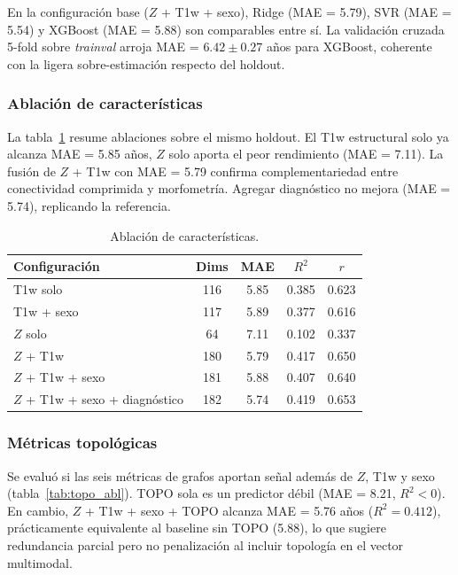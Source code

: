 \documentclass[12pt,a4paper]{article}
\begin{document}
En la configuración base ($Z$ + T1w + sexo), Ridge (MAE = 5.79), SVR (MAE = 5.54) y XGBoost
(MAE = 5.88) son comparables entre sí. La validación cruzada 5-fold sobre \emph{trainval}
arroja MAE = $6.42 \pm 0.27$ años para XGBoost, coherente con la ligera sobre-estimación respecto del holdout.

\subsubsection{Ablación de características}

La tabla~\ref{tab:ablacion} resume ablaciones sobre el mismo holdout. El T1w estructural solo ya alcanza MAE = 5.85 años, $Z$ solo aporta el peor rendimiento (MAE = 7.11). La fusión de $Z$ + T1w con MAE = 5.79 confirma complementariedad entre conectividad comprimida y morfometría. Agregar diagnóstico no mejora (MAE = 5.74), replicando la referencia\cite{bazan2026}.

\begin{table}[H]
  \centering
  \caption{Ablación de características.}
  \label{tab:ablacion}
  \begin{tabular}{lcccc}
    \toprule
    Configuración & Dims & MAE & $R^2$ & $r$ \\
    \midrule
    T1w solo & 116 & 5.85 & 0.385 & 0.623 \\
    T1w + sexo & 117 & 5.89 & 0.377 & 0.616 \\
    $Z$ solo & 64 & 7.11 & 0.102 & 0.337 \\
    $Z$ + T1w & 180 & 5.79 & 0.417 & 0.650 \\
    $Z$ + T1w + sexo & 181 & 5.88 & 0.407 & 0.640 \\
    $Z$ + T1w + sexo + diagnóstico & 182 & 5.74 & 0.419 & 0.653 \\
    \bottomrule
  \end{tabular}
\end{table}

\subsubsection{Métricas topológicas}

Se evaluó si las seis métricas de grafos\cite{rubinov2010} aportan señal además de $Z$, T1w y sexo (tabla~\ref{tab:topo_abl}). TOPO sola es un predictor débil (MAE = 8.21, $R^2 < 0$). En cambio, $Z$ + T1w + sexo + TOPO alcanza MAE = 5.76 años ($R^2 = 0.412$), prácticamente equivalente al baseline sin TOPO (5.88), lo que sugiere redundancia parcial pero no penalización al incluir topología en el vector multimodal.
\end{document}
